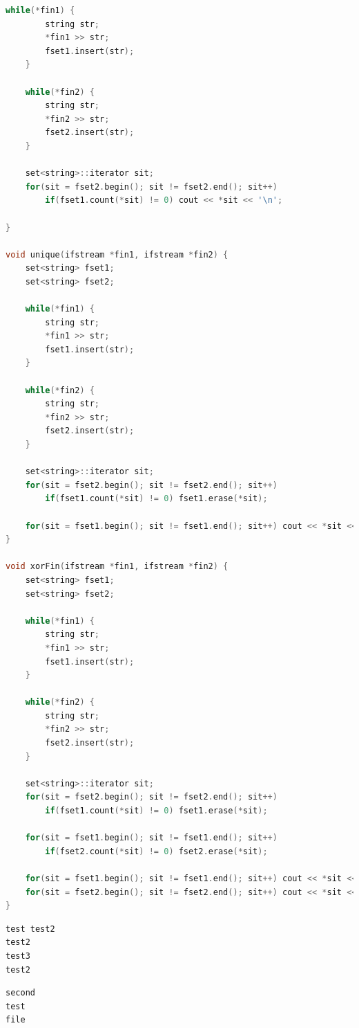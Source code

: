 \documentclass[letterpaper, 11pt]{article}
\begin{document}
\begin{lstlisting}[language=c++, caption=main.cpp]
    while(*fin1) {
        string str;
        *fin1 >> str;
        fset1.insert(str);
    }

    while(*fin2) {
        string str;
        *fin2 >> str;
        fset2.insert(str);
    }

    set<string>::iterator sit;
    for(sit = fset2.begin(); sit != fset2.end(); sit++) 
        if(fset1.count(*sit) != 0) cout << *sit << '\n';

}

void unique(ifstream *fin1, ifstream *fin2) {
    set<string> fset1;
    set<string> fset2;

    while(*fin1) {
        string str;
        *fin1 >> str;
        fset1.insert(str);
    }

    while(*fin2) {
        string str;
        *fin2 >> str;
        fset2.insert(str);
    }

    set<string>::iterator sit;
    for(sit = fset2.begin(); sit != fset2.end(); sit++) 
        if(fset1.count(*sit) != 0) fset1.erase(*sit);

    for(sit = fset1.begin(); sit != fset1.end(); sit++) cout << *sit << '\n';
}

void xorFin(ifstream *fin1, ifstream *fin2) {
    set<string> fset1;
    set<string> fset2;

    while(*fin1) {
        string str;
        *fin1 >> str;
        fset1.insert(str);
    }

    while(*fin2) {
        string str;
        *fin2 >> str;
        fset2.insert(str);
    }

    set<string>::iterator sit;
    for(sit = fset2.begin(); sit != fset2.end(); sit++) 
        if(fset1.count(*sit) != 0) fset1.erase(*sit);

    for(sit = fset1.begin(); sit != fset1.end(); sit++) 
        if(fset2.count(*sit) != 0) fset2.erase(*sit);

    for(sit = fset1.begin(); sit != fset1.end(); sit++) cout << *sit << '\n';
    for(sit = fset2.begin(); sit != fset2.end(); sit++) cout << *sit << '\n';
}
\end{lstlisting}

\begin{lstlisting}[caption=input.txt]
test test2
test2
test3
test2
\end{lstlisting}

\begin{lstlisting}[caption=input.txt]
second
test
file
\end{lstlisting}
\end{document}
